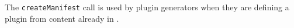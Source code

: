 The \verb+createManifest+ call is used by plugin generators when they are defining a plugin from content already in \Rapture.

